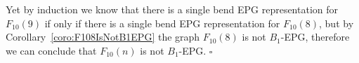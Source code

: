 \documentclass[9pt]{entcs}
\newtheorem{lema}{Lemma}[section]
\begin{document}
\begin{pf}
Yet by induction we know that there is a single bend EPG representation for $F_{10}(9)$ if only if there is a single bend EPG representation for $F_{10}(8)$, but by Corollary~\ref{coro:F108IsNotB1EPG} the graph $F_{10}(8)$ is not $B_1$-EPG, therefore we can conclude that $F_{10}(n)$ is not $B_1$-EPG.
 $\square$\end{pf} 


% 





% 

\end{document}
